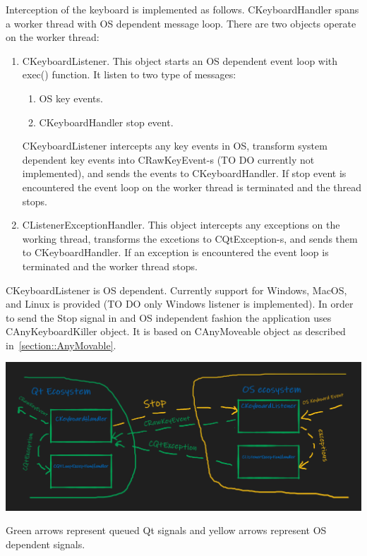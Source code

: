 \documentclass{article}
\begin{document}
Interception of the keyboard is implemented as follows. CKeyboardHandler spans a worker thread with OS dependent message loop. There are two objects operate on the worker thread:
\begin{enumerate}
\item CKeyboardListener. This object starts an OS dependent event loop with exec() function. It listen to two type of messages:
\begin{enumerate}
\item OS key events.
\item CKeyboardHandler stop event.
\end{enumerate}
CKeyboardListener intercepts any key events in OS, transform system dependent key events into CRawKeyEvent-s (TO DO currently not implemented), and sends the events to CKeyboardHandler. If stop event is encountered the event loop on the worker thread is terminated and the thread stops.

\item CListenerExceptionHandler. This object intercepts any exceptions on the working thread, transforms the excetions to CQtException-s, and sends them to CKeyboardHandler. If an exception is encountered the event loop is terminated and the worker thread stops.
\end{enumerate}

CKeyboardListener is OS dependent. Currently support for Windows, MacOS, and Linux is provided (TO DO only Windows listener is implemented). In order to send the Stop signal in and OS independent fashion the application uses CAnyKeyboardKiller object. It is based on CAnyMoveable object as described in~\ref{section::AnyMovable}.

\begin{center}
\includegraphics[scale = 0.5]{Figures/KeyboardInterception.png}

Green arrows represent queued Qt signals and yellow arrows represent OS dependent signals.
\end{center}
\end{document}
